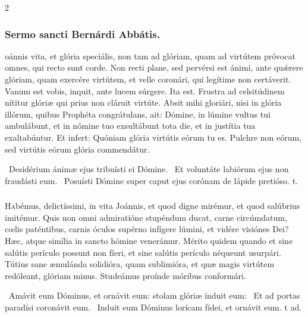\documentclass[9pt,twoside]{extarticle}
\begin{document}
\begin{multicols}{2}
\subsubsection*{\center Sermo sancti Bernárdi Abbátis.}
\begin{center}\end{center}
oánnis vita, et glória speciális, non tam ad glóriam, quam ad virtútem próvocat omnes, qui recto sunt corde. Non recti plane, sed pervérsi est ánimi, ante quǽrere glóriam, quam exercére virtútem, et velle coronári, qui legítime non certáverit. Vanum est vobis, inquit, ante lucem súrgere. Ita est. Frustra ad celsitúdinem nítitur glóriæ qui prius non cláruit virtúte. Absit mihi gloriári, nisi in glória illórum, quibus Prophéta congrátulans, ait: Dómine, in lúmine vultus tui ambulábunt, et in nómine tuo exsultábunt tota die, et in justítia tua exaltabúntur. Et infert: Quóniam glória virtútis eórum tu es. Pulchre non eórum, sed virtútis eórum glória commendátur.

\begin{tightlist}{}
\item {}~Desidérium ánimæ ejus tribuísti ei Dómine. \textred{*}~Et voluntáte labiórum ejus non fraudásti eum. ~Posuísti Dómine super caput ejus corónam de lápide pretióso. t.
\end{tightlist}

\subsubsection*{\center{}}
\lettrine{H}abémus, delictíssimi, in vita Joánnis, et quod digne mirémur, et quod salúbrius imitémur. Quis non omni admiratióne stupéndum ducat, carne circúmdatum, cœlis paténtibus, carnis óculos supérno infígere lúmini, et vidére visiónes Dei? Hæc, atque simília in sancto hómine venerámur. Mérito quidem quando et sine salútis perículo possunt non fíeri, et sine salútis perículo néqueunt usurpári. Tútius sane æmulánda solidióra, quam sublimióra, et quæ magis virtútem redóleant, glóriam minus. Studeámus proínde móribus conformári.

\begin{tightlist}{}
\item {}~Amávit eum Dóminus, et ornávit eum: stolam glóriæ índuit eum: \textred{*}~Et ad portas paradísi coronávit eum. ~Induit eum Dóminus lorícam fídei, et ornávit eum. t ad.
\end{tightlist}


\end{multicols}
\end{document}
